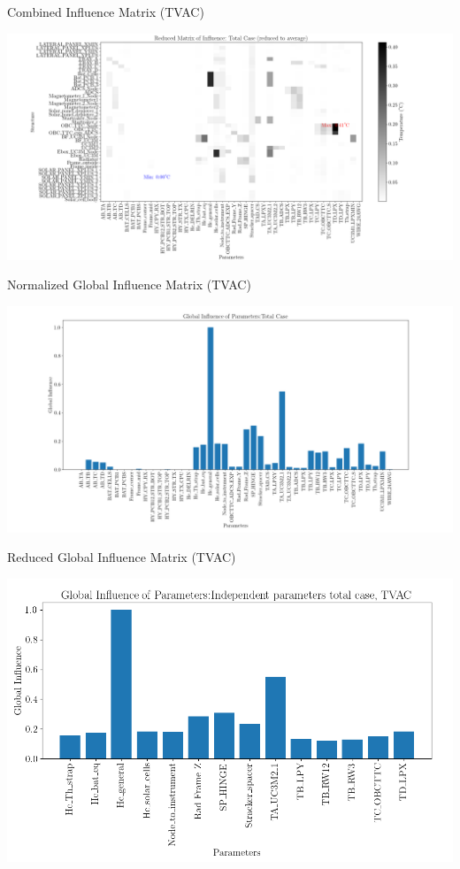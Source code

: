 \documentclass{cubeamer}
\begin{document}
\begin{frame}{Combined Influence Matrix (TVAC)}
\begin{center}

    \includegraphics[width=0.9\linewidth]{Figures/TVAC/infmatTC.png}
\end{center}

\end{frame}

\begin{frame}{Normalized Global Influence Matrix (TVAC)}
\begin{center}
 
    \includegraphics[width=0.9\linewidth]{Figures/TVAC/global-inf-TC.png}

\end{center}

\end{frame}

\begin{frame}{Reduced Global Influence Matrix (TVAC)}
\begin{center}

    \includegraphics[width=0.7\linewidth]{Figures/TVAC/parameters-imp-tvac2.png}
\end{center}

\end{frame}
\end{document}
